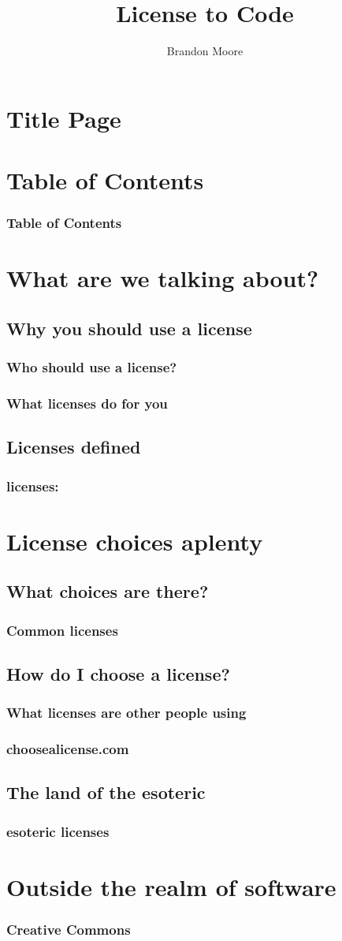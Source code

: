 \documentclass{beamer}
\begin{document}
	\title{License to Code}
	\author{Brandon Moore}
	\date{}
	\section{Title Page}
	\frame{\titlepage}
	\section{Table of Contents}
	\begin{frame}
		\frametitle{Table of Contents}
		\tableofcontents[]
	\end{frame}
	\section{What are we talking about?}
	\subsection{Why you should use a license}
	\begin{frame}
		\frametitle{Who should use a license?}
		
	\end{frame}
	\begin{frame}
		\frametitle{What licenses do for you}

	\end{frame}
	\subsection{Licenses defined}
	\begin{frame}
		\frametitle{licenses:}
		
	\end{frame}
	\section{License choices aplenty}
	\subsection{What choices are there?}
	\begin{frame}
		\frametitle{Common licenses}
	\end{frame}
	\subsection{How do I choose a license?}
	\begin{frame}
		\frametitle{What licenses are other people using}
	\end{frame}
	\begin{frame}
		\frametitle{choosealicense.com}
	\end{frame}
	\subsection{The land of the esoteric}
	\begin{frame}
		\frametitle{esoteric licenses}
	\end{frame}
	\section{Outside the realm of software}
	\begin{frame}
		\frametitle{Creative Commons}
	\end{frame}
\end{document}
